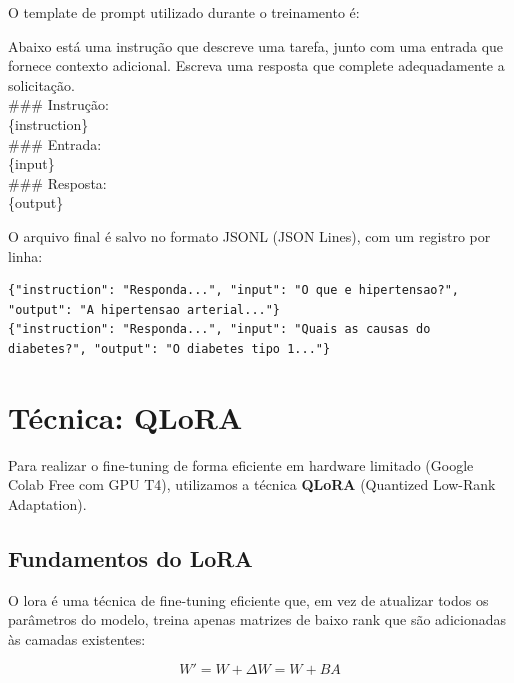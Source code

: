 O template de prompt utilizado durante o treinamento é:

\begin{tcolorbox}[colback=code-bg, colframe=fiap-gray, title=Template Alpaca em Português]
\ttfamily\small
Abaixo está uma instrução que descreve uma tarefa, junto com uma entrada que fornece contexto adicional. Escreva uma resposta que complete adequadamente a solicitação.\\[0.5em]
\#\#\# Instrução:\\
\{instruction\}\\[0.5em]
\#\#\# Entrada:\\
\{input\}\\[0.5em]
\#\#\# Resposta:\\
\{output\}
\end{tcolorbox}

O arquivo final é salvo no formato JSONL (JSON Lines), com um registro por linha:

\begin{lstlisting}[style=bash, caption={Exemplo do arquivo training\_data.jsonl}]
{"instruction": "Responda...", "input": "O que e hipertensao?", "output": "A hipertensao arterial..."}
{"instruction": "Responda...", "input": "Quais as causas do diabetes?", "output": "O diabetes tipo 1..."}
\end{lstlisting}

\section{Técnica: QLoRA}
\label{sec:qlora}

Para realizar o fine-tuning de forma eficiente em hardware limitado (Google Colab Free com GPU T4), utilizamos a técnica \textbf{QLoRA} (Quantized Low-Rank Adaptation).

\subsection{Fundamentos do LoRA}

O \acrfull{lora} é uma técnica de fine-tuning eficiente que, em vez de atualizar todos os parâmetros do modelo, treina apenas matrizes de baixo rank que são adicionadas às camadas existentes:

\begin{equation}
W' = W + \Delta W = W + BA
\end{equation}

